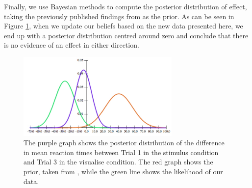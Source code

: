 \documentclass[smallextended]{svjour3}       %
\begin{document}
Finally, we use Bayesian methods \citep{dienes2008} to compute the posterior distribution of effect, taking the previously published findings from \cite{reinhart2015} as the prior. As can be seen in Figure \ref{fig:bayesResult}, when we update our beliefs based on the new data presented here, we end up with a posterior distribution centred around zero and conclude that there is no evidence of an effect in either direction.

\begin{figure}
\centering
\includegraphics[width=8cm]{figs/bayesResult.pdf}
\caption{The purple graph shows the posterior distribution of the difference in mean reaction times between Trial 1 in the stimulus condition and Trial 3 in the visualise condition. The red graph shows the prior, taken from \cite{reinhart2015}, while the green line shows the likelihood of our data.}
\label{fig:bayesResult}
\end{figure}



\end{document}
